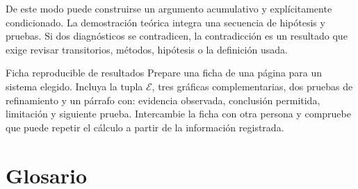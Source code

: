 \documentclass[11pt,a4paper]{article}
\begin{document}
De este modo puede construirse un argumento acumulativo y explícitamente condicionado.
La demostración teórica integra una secuencia de hipótesis y pruebas. Si dos
diagnósticos se contradicen, la contradicción es un resultado que exige revisar
transitorios, métodos, hipótesis o la definición usada.

\begin{activitybox}{Ficha reproducible de resultados}
Prepare una ficha de una página para un sistema elegido. Incluya la tupla
$\mathcal E$, tres gráficas complementarias, dos pruebas de refinamiento y un
párrafo con: evidencia observada, conclusión permitida, limitación y siguiente prueba.
Intercambie la ficha con otra persona y compruebe que puede repetir el cálculo a partir
de la información registrada.
\end{activitybox}

\section*{Glosario}
\end{document}
